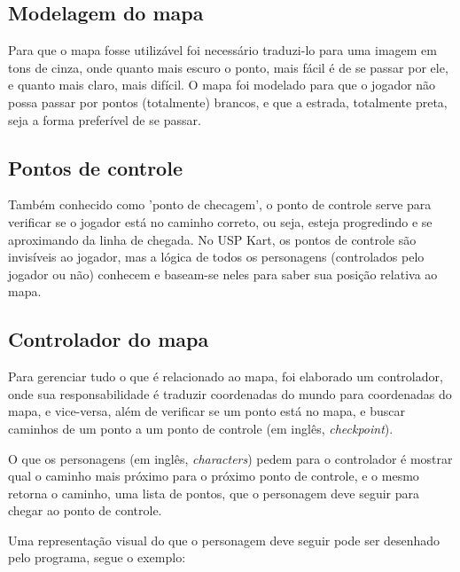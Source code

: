 \subsection{Modelagem do mapa}

Para que o mapa fosse utilizável foi necessário traduzi-lo para uma imagem em tons de cinza, onde quanto mais escuro o ponto, mais fácil é de se passar por ele, e quanto mais claro, mais difícil. O mapa foi modelado para que o jogador não possa passar por pontos (totalmente) brancos, e que a estrada, totalmente preta, seja a forma preferível de se passar.
\subsection{Pontos de controle}

Também conhecido como 'ponto de checagem', o ponto de controle serve para verificar se o jogador está no caminho correto, ou seja, esteja progredindo e se aproximando da linha de chegada. No USP Kart, os pontos de controle são invisíveis ao jogador, mas a lógica de todos os personagens (controlados pelo jogador ou não) conhecem e baseam-se neles para saber sua posição relativa ao mapa.

\subsection{Controlador do mapa}

Para gerenciar tudo o que é relacionado ao mapa, foi elaborado um controlador, onde sua responsabilidade é traduzir coordenadas do mundo para coordenadas do mapa, e vice-versa, além de verificar se um ponto está no mapa, e buscar caminhos de um ponto a um ponto de controle (em inglês, \textit{checkpoint}).

O que os personagens (em inglês, \textit{characters}) pedem para o controlador é mostrar qual o caminho mais próximo para o próximo ponto de controle, e o mesmo retorna o caminho, uma lista de pontos, que o personagem deve seguir para chegar ao ponto de controle.

Uma representação visual do que o personagem deve seguir pode ser desenhado pelo programa, segue o exemplo:


